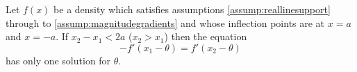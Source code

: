 
		\begin{lemma}
			\label{lem:magnitudegradients}
			Let $f(x)$ be a density which satisfies assumptions \ref{assump:reallinesupport} through to \ref{assump:magnitudegradients} and whose inflection points are at $x=a$ and $x=-a$. If 
			$x_2 - x_1 < 2a$ ($x_2 > x_1$) then the equation
			\begin{equation}
				-f'(x_1 - \theta) = f'(x_2 - \theta)
				\label{eq:gradientsequal}
			\end{equation}
			has only one solution for $\theta$.
		\end{lemma}
